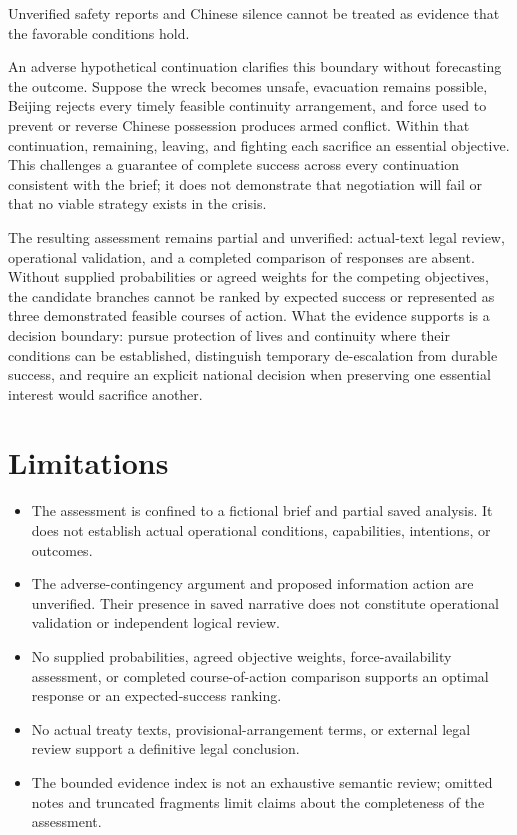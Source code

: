 \documentclass[11pt]{article}
\begin{document}
Unverified safety reports and Chinese silence cannot be treated as evidence that the favorable conditions hold.

An adverse hypothetical continuation clarifies this boundary without forecasting the outcome. Suppose the wreck becomes unsafe, evacuation remains possible, Beijing rejects every timely feasible continuity arrangement, and force used to prevent or reverse Chinese possession produces armed conflict. Within that continuation, remaining, leaving, and fighting each sacrifice an essential objective. This challenges a guarantee of complete success across every continuation consistent with the brief; it does not demonstrate that negotiation will fail or that no viable strategy exists in the crisis.

The resulting assessment remains partial and unverified: actual-text legal review, operational validation, and a completed comparison of responses are absent. Without supplied probabilities or agreed weights for the competing objectives, the candidate branches cannot be ranked by expected success or represented as three demonstrated feasible courses of action. What the evidence supports is a decision boundary: pursue protection of lives and continuity where their conditions can be established, distinguish temporary de-escalation from durable success, and require an explicit national decision when preserving one essential interest would sacrifice another.

\section{Limitations}
\begin{itemize}
\item The assessment is confined to a fictional brief and partial saved analysis. It does not establish actual operational conditions, capabilities, intentions, or outcomes.
\item The adverse-contingency argument and proposed information action are unverified. Their presence in saved narrative does not constitute operational validation or independent logical review.
\item No supplied probabilities, agreed objective weights, force-availability assessment, or completed course-of-action comparison supports an optimal response or an expected-success ranking.
\item No actual treaty texts, provisional-arrangement terms, or external legal review support a definitive legal conclusion.
\item The bounded evidence index is not an exhaustive semantic review; omitted notes and truncated fragments limit claims about the completeness of the assessment.
\end{itemize}
\end{document}
